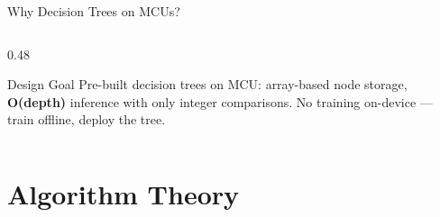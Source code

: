 \documentclass[aspectratio=169, 10pt]{beamer}
\begin{document}
\begin{frame}{Why Decision Trees on MCUs?}
\begin{columns}[T]
\begin{column}{0.48\textwidth}
\begin{center}
\end{center}

\vspace{0.5em}
\begin{alertblock}{Design Goal}
Pre-built decision trees on MCU: array-based node storage,
\textbf{O(depth)} inference with only integer comparisons.
No training on-device --- train offline, deploy the tree.
\end{alertblock}
\end{column}
\end{columns}
\end{frame}

\section{Algorithm Theory}
\end{document}
